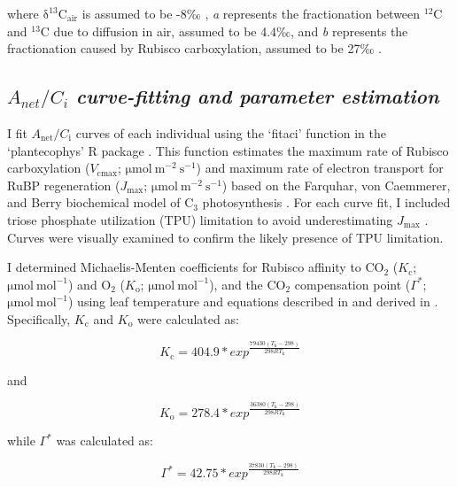 \noindent where $\mathrm{\delta^{13}C_{air}}$ is assumed to be -8‰ , \textit{a} represents the fractionation between $^{12}$C and $^{13}$C due to diffusion in air, assumed to be 4.4‰, and \textit{b} represents the fractionation caused by Rubisco carboxylation, assumed to be 27‰ .
    
\subsection{$A_{net}/C_i$ \textit{curve-fitting and parameter estimation}}
\noindent I fit $A_\mathrm{net}/C_\mathrm{i}$ curves of each individual using the `fitaci' function in the `plantecophys' R package . This function estimates the maximum rate of Rubisco carboxylation ($V_\mathrm{cmax}$; $\mathrm{\mu mol\ m^{-2}\ s^{-1}}$) and maximum rate of electron transport for RuBP regeneration ($J_\mathrm{max}$; $\mathrm{\mu mol\ m^{-2}\ s^{-1}}$) based on the Farquhar, von Caemmerer, and Berry biochemical model of C$_{3}$ photosynthesis . For each curve fit, I included triose phosphate utilization (TPU) limitation to avoid underestimating $J_{\mathrm{max}}$ . Curves were visually examined to confirm the likely presence of TPU limitation. 
    
I determined Michaelis-Menten coefficients for Rubisco affinity to CO$_2$ ($K_\mathrm{c}$; $\mathrm{\mu mol\ mol^{-1}}$) and $\mathrm{O_2}$ ($K_\mathrm{o}$; $\mathrm{\mu mol\ mol^{-1}}$), and the CO$_2$ compensation point ($\Gamma^*$; $\mathrm{\mu mol\ mol^{-1}}$) using leaf temperature and equations described in  and derived in . Specifically, $K_\mathrm{c}$ and $K_\mathrm{o}$ were calculated as:

\begin{equation} \label{eq_2.3}
    K_\mathrm{c}=404.9*exp^{\frac{79430(T_\mathrm{k}-298)}{298RT_\mathrm{k}}}
\end{equation}
    
\noindent and
    
\begin{equation} \label{eq_2.4}
    K_\mathrm{o}=278.4*exp^{\frac{36380(T_\mathrm{k}-298)}{298RT_\mathrm{k}}}
\end{equation}
    
\noindent while $\Gamma^*$ was calculated as:
    
\begin{equation} \label{eq_2.5}
    \Gamma^\mathrm{*}=42.75*exp^{\frac{37830(T_\mathrm{k}-298)}{298RT_\mathrm{k}}}
\end{equation}

